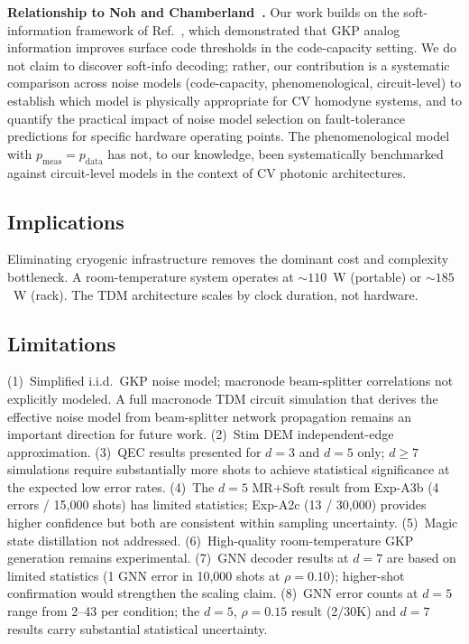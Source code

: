 \documentclass[twocolumn,showpacs,preprintnumbers,amsmath,amssymb,superscriptaddress]{revtex4-2}
\begin{document}
\textbf{Relationship to Noh and Chamberland~\cite{noh2022}.} Our work builds on the soft-information framework of Ref.~\cite{noh2022}, which demonstrated that GKP analog information improves surface code thresholds in the code-capacity setting. We do not claim to discover soft-info decoding; rather, our contribution is a systematic comparison across noise models (code-capacity, phenomenological, circuit-level) to establish which model is physically appropriate for CV homodyne systems, and to quantify the practical impact of noise model selection on fault-tolerance predictions for specific hardware operating points. The phenomenological model with $p_{\mathrm{meas}} = p_{\mathrm{data}}$ has not, to our knowledge, been systematically benchmarked against circuit-level models in the context of CV photonic architectures.

\subsection{Implications}

Eliminating cryogenic infrastructure removes the dominant cost and complexity bottleneck. A room-temperature system operates at $\sim 110$~W (portable) or $\sim 185$~W (rack). The TDM architecture scales by clock duration, not hardware.

\subsection{Limitations}

(1)~Simplified i.i.d.\ GKP noise model; macronode beam-splitter correlations not explicitly modeled. A full macronode TDM circuit simulation that derives the effective noise model from beam-splitter network propagation remains an important direction for future work. (2)~Stim DEM independent-edge approximation. (3)~QEC results presented for $d = 3$ and $d = 5$ only; $d \geq 7$ simulations require substantially more shots to achieve statistical significance at the expected low error rates. (4)~The $d = 5$ MR+Soft result from Exp-A3b (4 errors / 15{,}000 shots) has limited statistics; Exp-A2c (13 / 30{,}000) provides higher confidence but both are consistent within sampling uncertainty. (5)~Magic state distillation not addressed. (6)~High-quality room-temperature GKP generation remains experimental. (7)~GNN decoder results at $d = 7$ are based on limited statistics (1 GNN error in 10{,}000 shots at $\rho = 0.10$); higher-shot confirmation would strengthen the scaling claim. (8)~GNN error counts at $d = 5$ range from 2--43 per condition; the $d = 5$, $\rho = 0.15$ result (2/30K) and $d = 7$ results carry substantial statistical uncertainty.
\end{document}
